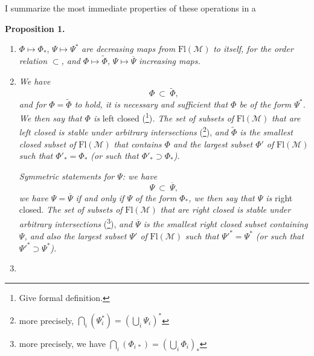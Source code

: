 \documentclass[11pt]{article}
\newcommand{\printedpage}[1]{\marginpar{\footnotesize p.~#1}}
\newcommand{\msp}[1]{\marginpar{\footnotesize [#1]}}
\newcommand{\Fl}{\mathrm{Fl}}
\newcommand{\M}{\mathcal{M}}
\begin{document}
\msp{page 2}

I summarize the most immediate properties of these operations in a

\noindent\textbf{Proposition 1.}

\begin{enumerate}[label={}]
\item[a)] $\Phi \longmapsto \Phi_*$, $\Psi \longmapsto \Psi^*$ \textit{are decreasing maps from} $\Fl(\M)$ \textit{to itself, for the order relation} $\subset$\textit{, and} $\Phi \longmapsto \widetilde{\Phi}$\textit{,} $\Psi \longmapsto \overline{\Psi}$ \textit{increasing maps.}

\printedpage{2}

\item[b)] \textit{We have}
\[
\Phi\ \subset\ \widetilde{\Phi},
\]
\textit{and for $\Phi = \widetilde{\Phi}$ to hold, it is necessary and sufficient that $\Phi$ be of the form $\Psi^*$. We then say that $\Phi$ is} \textup{left closed} (\footnote[2]{Give formal definition.})\textit{. The set of subsets of} $\Fl(\M)$ \textit{that are left closed is stable under arbitrary intersections} (\footnote[3]{more precisely, $\bigcap_i(\Psi_i^*) = (\bigcup_i \Psi_i)^*$}), \textit{and $\widetilde{\Phi}$ is the smallest closed subset of} $\Fl(\M)$ \textit{that contains $\Phi$ and the largest subset $\Phi'$ of} $\Fl(\M)$ \textit{such that $\Phi'_* = \Phi_*$ (or such that $\Phi'_* \supset \Phi_*$).}

\textit{Symmetric statements for $\Psi$: we have}
\[
\Psi\ \subset\ \overline{\Psi},
\]
\textit{we have $\Psi = \overline{\Psi}$ if and only if $\Psi$} \textit{of the form $\Phi_*$, we then say that $\Psi$ is} \textup{right closed.} \textit{The set of subsets of} $\Fl(\M)$ \textit{that are right closed is stable under arbitrary intersections} (\footnote[4]{more precisely, we have $\bigcap_i(\Phi_{i\,*}) = (\bigcup_i \Phi_i)_*$}), \textit{and $\overline{\Psi}$ is the smallest right closed subset containing $\Psi$, and also the largest subset $\Psi'$ of} $\Fl(\M)$ \textit{such that $\Psi'^* = \Psi^*$ (or such that $\Psi'^* \supset \Psi^*$).}

\item[] \hspace*{-2.5em}\msp{page 3}


\end{enumerate}
\end{document}

